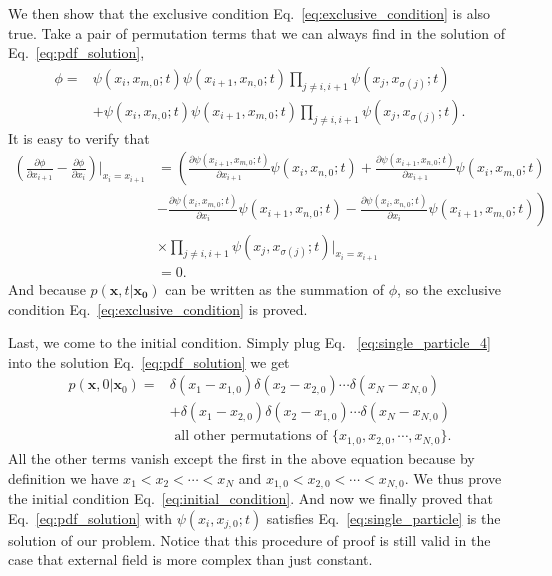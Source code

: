 We then show that the exclusive condition Eq.~\eqref{eq:exclusive_condition} is also true. Take a pair of permutation terms that we can always find in the solution of Eq.~\eqref{eq:pdf_solution}, 
\begin{align*}
    \phi = & \psi(x_i, x_{m,0};t)\psi(x_{i+1}, x_{n,0};t) \prod_{j\neq i,i+1} \psi(x_j, x_{\sigma(j)};t)  \\
    & + \psi(x_i, x_{n,0};t)\psi(x_{i+1}, x_{m,0};t)\prod_{j\neq i,i+1} \psi(x_j, x_{\sigma(j)};t).
\end{align*}
It is easy to verify that
\begin{align*}
    \left(\frac{\partial \phi}{\partial x_{i+1}} - \frac{\partial \phi}{\partial x_{i}}\right)\Bigg|_{x_i = x_{i+1}} & =  \left(\frac{\partial\psi(x_{i+1}, x_{m,0};t)}{\partial x_{i+1}}\psi(x_{i}, x_{n,0};t) + \frac{\partial\psi(x_{i+1}, x_{n,0};t)}{\partial x_{i+1}}\psi(x_{i}, x_{m,0};t)\right. \\ 
    &\left. - \frac{\partial\psi(x_i, x_{m,0};t)}{\partial x_i}\psi(x_{i+1}, x_{n,0};t) - \frac{\partial\psi(x_i, x_{n,0};t)}{\partial x_i}\psi(x_{i+1}, x_{m,0};t)\right) \\ 
    & \times\prod_{j\neq i,i+1}\psi(x_j, x_{\sigma(j)};t)\Bigg|_{x_i = x_{i+1}} \\
    & = 0.
\end{align*}
And because $p(\mathbf{x}, t | \mathbf{x_0})$ can be written as the summation of $\phi$, so the exclusive condition Eq.~\eqref{eq:exclusive_condition} is proved.

Last, we come to the initial condition. Simply plug Eq.~
\eqref{eq:single_particle_4} into the solution Eq.~\eqref{eq:pdf_solution} we get
\begin{align*}
    p(\mathbf{x}, 0 | \mathbf{x}_0) = & 
    \delta(x_1-x_{1,0})\delta(x_2-x_{2,0})\cdots\delta(x_N-x_{N,0}) \\
    & + \delta(x_1-x_{2,0})\delta(x_2-x_{1,0})\cdots\delta(x_N-x_{N,0}) \\
    & \text{ all other permutations of } \{x_{1,0}, x_{2,0}, \cdots, x_{N,0}\}.
\end{align*}
All the other terms vanish except the first in the above equation because by definition we have $x_{1}<x_{2}<\cdots<x_{N}$ and $x_{1,0}<x_{2,0}<\cdots<x_{N,0}$.  We thus prove the initial condition Eq.~\eqref{eq:initial_condition}. And now we finally proved that Eq.~\eqref{eq:pdf_solution} with $\psi(x_i, x_{j,0};t)$ satisfies Eq.~\eqref{eq:single_particle} is the solution of our problem.  Notice that this procedure of proof is still valid in the case that external field is more complex than just constant.

